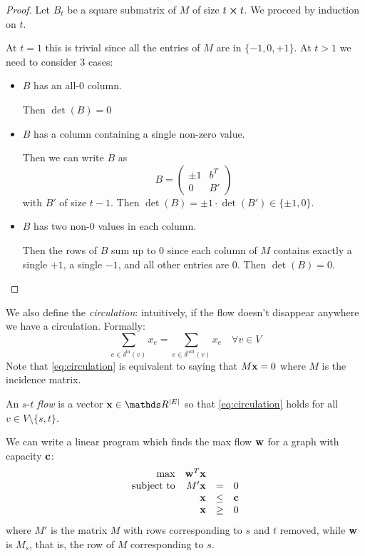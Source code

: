 \documentclass[12pt]{extarticle}
\renewcommand{\vec}[1]{\bvec{#1}}
\begin{document}
\begin{proof}
	Let $B_t$ be a square submatrix of $M$ of size $t\cross t$.
	We proceed by induction on $t$.

	At $t = 1$ this is trivial since all the entries of $M$ are in $\{-1, 0, +1\}$.
	At $t > 1$ we need to consider 3 cases:
	\begin{itemize}
		\item $B$ has an all-$0$ column.

		      Then $\det(B) = 0$

		\item $B$ has a column containing a single non-zero value.

		      Then we can write $B$ as
		      \begin{equation}
			      B = \begin{pmatrix}
				      \pm 1 & b^T \\
				      0     & B'
			      \end{pmatrix}
		      \end{equation}
		      with $B'$ of size $t-1$.
		      Then $\det(B) = \pm 1 \cdot \det (B') \in \{\pm 1, 0\}$.

		\item $B$ has two non-$0$ values in each column.

		      Then the rows of $B$ sum up to $0$ since each column of $M$ contains exactly a single $+1$, a
		      single $-1$, and all other entries are $0$.
		      Then $\det(B) = 0$.
		      \qedhere
	\end{itemize}
\end{proof}

We also define the \emph{circulation}: intuitively, if the flow doesn't disappear anywhere we have a
circulation. Formally:
\begin{equation}
	\sum_{e \in \delta^\text{in}(v)} x_e = \sum_{e \in \delta^\text{out}(v)} x_e \quad \forall v \in V
	\label{eq:circulation}
\end{equation}
Note that \cref{eq:circulation} is equivalent to saying that $M \vec x = 0$ where $M$ is the
incidence matrix.

An $s$-$t$ \emph{flow} is a vector $\vec x \in \R^{\abs{E}}$ so that \cref{eq:circulation} holds for
all $v \in V \setminus \{s, t\}$.

We can write a linear program which finds the max flow $\vec w$ for a graph with capacity $\vec c$:
\begin{equation}
	\begin{array}{rrcl}
		\max              & \vec w^T \vec x &      &        \\
		\text{subject to} & M' \vec x       & =    & 0      \\
		                  & \vec x          & \leq & \vec c \\
		                  & \vec x          & \geq & 0
	\end{array}
	\label{eq:st-flow}
\end{equation}
where $M'$ is the matrix $M$ with rows corresponding to $s$ and $t$ removed, while $\vec w$ is
$M_s$, that is, the row of $M$ corresponding to $s$.
\end{document}
